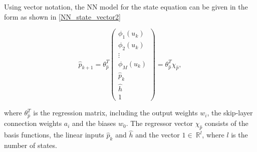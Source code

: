  Using vector notation, the NN model for the state equation can be given in the form as shown in \eqref{NN_state_vector2}

  \begin{equation}
\label{NN_state_vector2}
\hat{p}_{k+1} = \theta^T_{\hat{p}} 
          \begin{pmatrix}
           \phi_1(u_k) \\[1pt]
           \phi_2(u_k) \\[1pt]
           \vdots \\[1pt]
           \phi_M(u_k)\\[3pt]
           \hat{p}_k \\
           \hat{h}\\
           1 
         \end{pmatrix}
         =
         \theta^T_{\hat{p}} \chi_{\hat{p}},
\end{equation}

where $\theta^T_{\hat{p}}$ is the regression matrix, including the output weights $w_i$, the skip-layer connection weights $a_i$ and the biases $w_0$. The regressor vector $\chi_{\hat{p}}$ consists of the basis functions, the linear inputs $\hat{p}_k$ and $\hat{h}$ and the vector $1 \in \: \mathbb{R}^{l} $, where $l$ is the number of states.




